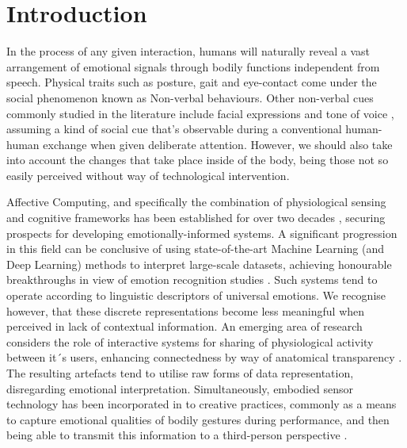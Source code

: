 

\chapter{Introduction}
\label{sec:objectives}

In the process of any given interaction, humans will naturally reveal a vast arrangement of emotional signals through bodily functions independent from speech. Physical traits such as posture, gait and eye-contact come under the social phenomenon known as Non-verbal behaviours. Other non-verbal cues commonly studied in the literature include facial expressions and tone of voice \cite{carton_nonverbal_1999}, assuming a kind of social cue that's observable during a conventional human-human exchange when given deliberate attention. However, we should also take into account the changes that take place inside of the body, being those not so easily perceived without way of technological intervention.

Affective Computing, and specifically the combination of physiological sensing and cognitive frameworks has been established for over two decades \cite{picard_affective_2000}, securing prospects for developing emotionally-informed systems. A significant progression in this field can be conclusive of using state-of-the-art Machine Learning (and Deep Learning) methods to interpret large-scale datasets, achieving honourable breakthroughs in view of emotion recognition studies \cite{bota_review_2019}. Such systems tend to operate according to linguistic descriptors of universal emotions. We recognise however, that these discrete representations become less meaningful when perceived in lack of contextual information. An emerging area of research considers the role of interactive systems for sharing of physiological activity between it´s users, enhancing connectedness by way of anatomical transparency \cite{lux_live_2018}. The resulting artefacts tend to utilise raw forms of data representation, disregarding emotional interpretation. Simultaneously, embodied sensor technology has been incorporated in to creative practices, commonly as a means to capture emotional qualities of bodily gestures during performance, and then being able to transmit this information to a third-person perspective \cite{fdili_alaoui_seeing_2017}. 

